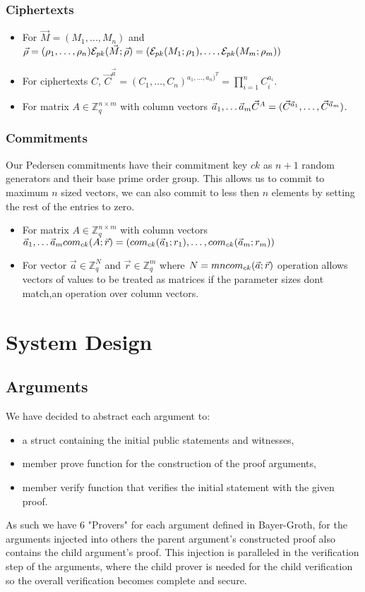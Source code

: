 \documentclass[12pt,a4paper]{report}
\begin{document}
\subsubsection{Ciphertexts}
\begin{itemize}
	\item For $\vec{M} = (M_1,\ldots,M_n)$ and $\vec{\rho} = (\rho_1,\ldots,\rho_n)\\ \mathcal{E}_{pk}(\vec{M}; \vec{\rho}) = (\mathcal{E}_{pk}(M_1;\rho_1),\ldots,\mathcal{E}_{pk}(M_m;\rho_m))$
	\item For ciphertexts $C$, $\displaystyle \vec{C}^{\vec{a}} = (C_1,\ldots,C_n)^{a_1,\ldots,a_n)^T} = \prod_{i=1}^n C_i^{a_i}$.
	\item For matrix $A \in \mathbb{Z}^{n \times m}_q$ with column vectors $\vec{a}_1,\ldots\vec{a}_m\\ \vec{C}^A = (\vec{C}^{\vec{a}_1},\ldots,\vec{C}^{\vec{a}_m})$.
\end{itemize}
\subsubsection{Commitments}
Our Pedersen commitments have their commitment key $ck$ as $n+1$ random generators and their base prime order group. 
This allows us to commit to maximum $n$ sized vectors, we can also commit to less then $n$ elements by setting the rest of the entries to zero.
\begin{itemize}
	\item For matrix $A \in \mathbb{Z}^{n \times m}_q$ with column vectors $\vec{a}_1,\ldots\vec{a}_m\\ com_{ck}(A; \vec{r}) = (com_{ck}(\vec{a}_1;r_1),\ldots,com_{ck}(\vec{a}_m; r_m))$
	\item For vector $\vec{a} \in \mathbb{Z}_q^N$ and $\vec{r} \in \mathbb{Z}_q^m$ where $N = mn\\ com_{ck}(\vec{a};\vec{r})$ operation allows vectors of values to be treated as matrices if the parameter sizes dont match,an operation over column vectors.
\end{itemize}
\section{System Design}
\subsection*{Arguments}
We have decided to abstract each argument to:
\begin{itemize}
	\item a struct containing the initial public statements and witnesses,
	\item member prove function for the construction of the proof arguments,
	\item member verify function that verifies the initial statement with the given proof.
\end{itemize}
As such we have 6 "Provers" for each argument defined in Bayer-Groth, for the arguments injected into others the parent argument's constructed proof also contains the child argument's proof. 
This injection is paralleled in the verification step of the arguments, where the child prover is needed for the child verification so the overall verification becomes complete and secure.
\end{document}

